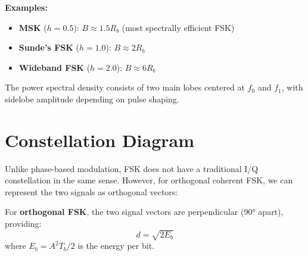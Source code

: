 \textbf{Examples:}
\begin{itemize}
\item \textbf{MSK} ($h = 0.5$): $B \approx 1.5 R_b$ (most spectrally efficient FSK)
\item \textbf{Sunde's FSK} ($h = 1.0$): $B \approx 2 R_b$
\item \textbf{Wideband FSK} ($h = 2.0$): $B \approx 6 R_b$
\end{itemize}

The power spectral density consists of two main lobes centered at $f_0$ and $f_1$, with sidelobe amplitude depending on pulse shaping.

\section{Constellation Diagram}

Unlike phase-based modulation, FSK does not have a traditional I/Q constellation in the same sense. However, for orthogonal coherent FSK, we can represent the two signals as orthogonal vectors:

\begin{center}
\end{center}

For \textbf{orthogonal FSK}, the two signal vectors are perpendicular (90° apart), providing:
\begin{equation}
d = \sqrt{2E_b}
\end{equation}
where $E_b = A^2T_b/2$ is the energy per bit.

